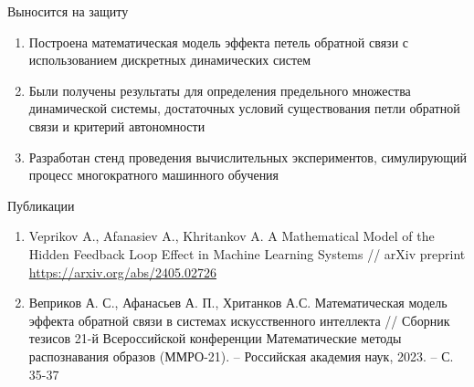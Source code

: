 \documentclass[aspectratio=169]{beamer}
\begin{document}
\begin{frame}{Выносится на защиту}
    \begin{enumerate}
        \item Построена математическая модель эффекта петель обратной связи с использованием дискретных динамических систем
        \item Были получены результаты для определения предельного множества динамической системы, достаточных условий существования петли обратной связи и критерий автономности
        \item Разработан стенд проведения вычислительных экспериментов, симулирующий процесс многократного машинного обучения
    \end{enumerate}
    \begin{block}{Публикации}%
    \footnotesize
    \begin{enumerate}
        \item Veprikov A.,   Afanasiev A., Khritankov A. A Mathematical Model of the Hidden Feedback Loop Effect in Machine Learning Systems // arXiv preprint \url{https://arxiv.org/abs/2405.02726}
        \item Веприков А. С., Афанасьев А. П., Хританков А.С. Математическая модель эффекта обратной связи в системах искусственного интеллекта // Сборник тезисов 21-й Всероссийской конференции Математические методы распознавания образов (ММРО-21). – Российская академия наук, 2023. – С. 35-37 
    \end{enumerate}
    \end{block}
\end{frame}
\end{document}
